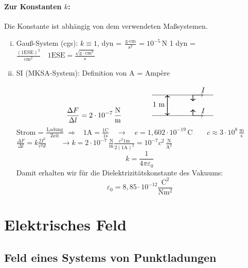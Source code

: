 \documentclass[titlepage,11pt,a4paper,ngerman]{report}
\newcommand{\tx}[1]{\textrm{#1}}
\renewcommand{\epsilon}{\varepsilon}
\begin{document}
\paragraph{Zur Konstanten $k$:}
Die Konstante ist abhängig von dem verwendeten Maßsystemen.
\begin{enumerate}[i)]
	\item Gauß-System (cgs): $k \equiv 1$, dyn = $\frac{\textrm{g}\cdot \textrm{cm}}{\textrm{s}^2} = 10^{-5}\,\textrm{N}$
	1 dyn = $\frac{(1\textrm{ESE})^2}{\textrm{cm}^2} \quad 1\textrm{ESE} = \frac{\sqrt{\textrm{g}\cdot \textrm{cm}^3}}{\textrm{s}}$
	\item SI (MKSA-System): Definition von A = Amp\`ere 
	
	
	
	\vspace{-15pt}
	$$\frac{\Delta F}{\Delta l}= 2 \cdot 10^{-7}\,\frac{\textrm{N}}{\textrm{m}} \qquad \qquad \begin{tikzpicture}
	\draw (0,0) -- (3,0);
	\draw (0,1) -- (3,1);
	\draw[thick,<->] (.75,0) -- (.75,1) node[anchor=north east,yshift=-6pt] {1 m};
	\draw[thick,->] (2,0) -- (2,.3);
	\draw[thick,->] (2,1) -- (2,.7);
	\draw[->] (2,0) -- (2.5,0) node[above] {$ I $};
	\draw[->] (2,1) -- (2.5,1) node[above] {$ I $};
	\end{tikzpicture}$$
	Strom = $\frac{\textrm{Ladung}}{\textrm{Zeit}}$ $\Rightarrow$  \ 
	$
	1 \tx{A} = \frac{1 \tx{C}}{1 \tx{s}} \quad \rightarrow \quad e = 1{,}602 \cdot 10^{-19} \, \tx{C} \qquad c \approx 3 \cdot 10^{8} \, \frac{\tx{m}}{\tx{s}}
	$\\[5pt]
	$
	\frac{\Delta F}{\Delta l} = k \frac{2 I^2}{c^2 d} \qquad \rightarrow k = 2 \cdot 10^{-7} \ \frac{\tx{N}}{\tx{m}} \frac{c^2 1 \tx{m}}{2 (1 \tx{A})^2} = 10^{-7} c^2 \, \frac{\tx{N}}{\tx{A}^2}
	$
	\begin{equation*}
	k = \frac{1}{4 \pi \epsilon_0}
	\end{equation*}
	Damit erhalten wir für die Dielektrizitätskonstante des Vakuums:
	\begin{equation*}
	\epsilon_0 = 8{,}85 \cdot 10^{-12} \frac{\tx{C}^2}{\tx{N} \tx{m}^2}
	\end{equation*}
\end{enumerate}


\section{Elektrisches Feld}
\subsection{Feld eines Systems von Punktladungen}
\end{document}

